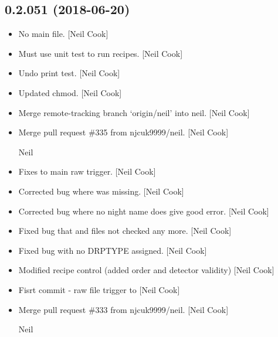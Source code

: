 \documentclass[a4paper,10pt,english]{report}
\begin{document}
\subsection{0.2.051 (2018-06-20)}
\label{\detokenize{misc/changelog:id415}}\begin{itemize}
\item {} 
No main file. {[}Neil Cook{]}

\item {} 
Must use unit test to run recipes. {[}Neil Cook{]}

\item {} 
Undo print test. {[}Neil Cook{]}

\item {} 
Updated chmod. {[}Neil Cook{]}

\item {} 
Merge remote-tracking branch ‘origin/neil’ into neil. {[}Neil Cook{]}

\item {} 
Merge pull request \#335 from njcuk9999/neil. {[}Neil Cook{]}

Neil

\item {} 
Fixes to main raw trigger. {[}Neil Cook{]}

\item {} 
Corrected bug where  was missing. {[}Neil Cook{]}

\item {} 
Corrected bug where no night name does give good error. {[}Neil Cook{]}

\item {} 
Fixed bug that  and files not checked any more. {[}Neil
Cook{]}

\item {} 
Fixed bug with no DRPTYPE assigned. {[}Neil Cook{]}

\item {} 
Modified recipe control (added order and detector validity) {[}Neil
Cook{]}

\item {} 
Fisrt commit - raw file trigger  to  {[}Neil Cook{]}

\item {} 
Merge pull request \#333 from njcuk9999/neil. {[}Neil Cook{]}

Neil

\end{itemize}
\end{document}
